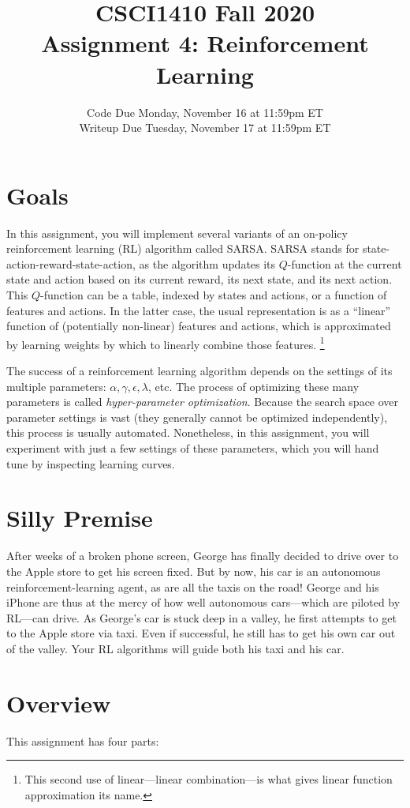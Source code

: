 \documentclass{article}
\title{CSCI1410 Fall 2020 \\
Assignment 4: Reinforcement Learning}
\date{Code Due Monday, November 16 at 11:59pm ET \\ [1ex]
Writeup Due Tuesday, November 17 at 11:59pm ET}
\begin{document}
\maketitle


\section{Goals}
In this assignment, you will implement several variants of an
on-policy reinforcement learning (RL) algorithm called SARSA.  SARSA
stands for state-action-reward-state-action, as the algorithm updates
its $Q$-function at the current state and action based on its current
reward, its next state, and its next action.  This $Q$-function can be
a table, indexed by states and actions, or a function of features and
actions.  In the latter case, the usual representation is as a
``linear'' function of (potentially non-linear) features and actions,
which is approximated by learning weights by which to linearly combine
those features.%
\footnote{This second use of linear---linear combination---is what
  gives linear function approximation its name.}

The success of a reinforcement learning algorithm depends on the
settings of its multiple parameters: $\alpha, \gamma, \epsilon,
\lambda$, etc.  The process of optimizing these many parameters is
called \emph{hyper-parameter optimization}.  Because the search space
over parameter settings is vast (they generally cannot be optimized
independently), this process is usually automated.  Nonetheless, in
this assignment, you will experiment with just a few settings of these
parameters, which you will hand tune by inspecting learning curves.


\section{Silly Premise}
After weeks of a broken phone screen, George has finally decided to
drive over to the Apple store to get his screen fixed.  But by now,
his car is an autonomous reinforcement-learning agent, as are all the
taxis on the road!  George and his iPhone are thus at the mercy of how
well autonomous cars---which are piloted by RL---can drive.  As
George's car is stuck deep in a valley, he first attempts to get to
the Apple store via taxi.  Even if successful, he still has to get his
own car out of the valley.  Your RL algorithms will guide both his
taxi and his car.


\section{Overview}
This assignment has four parts:
\end{document}
